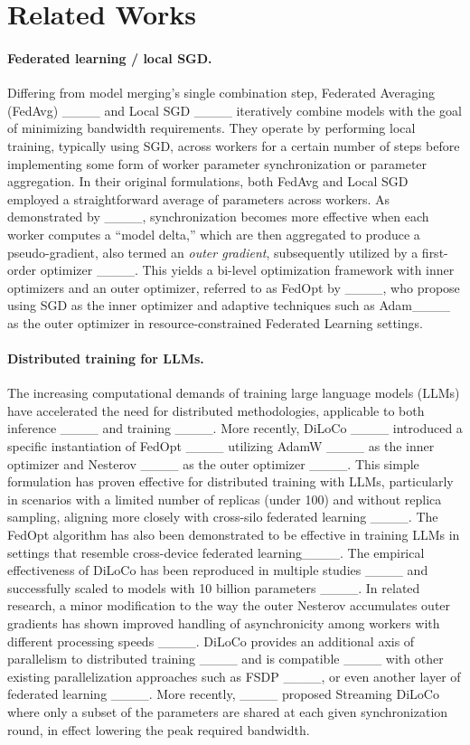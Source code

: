\section{Related Works}
\label{sec:related_works}



\paragraph{Federated learning / local SGD.}  Differing from model merging's single combination step, Federated Averaging (FedAvg) ____ and Local SGD ____ iteratively combine models with the goal of minimizing bandwidth requirements. They operate by performing local training, typically using SGD, across workers for a certain number of steps before implementing some form of worker parameter synchronization or parameter aggregation.  In their original formulations, both FedAvg and Local SGD employed a straightforward average of parameters across workers.  As demonstrated by ____, synchronization becomes more effective when each worker computes a ``model delta,'' which are then aggregated to produce a pseudo-gradient, also termed an \textit{outer gradient}, subsequently utilized by a first-order optimizer ____.  This yields a bi-level optimization framework with inner optimizers and an outer optimizer, referred to as FedOpt by ____, who propose using SGD as the inner optimizer and adaptive techniques such as Adam____ as the outer optimizer in resource-constrained Federated Learning settings.

\paragraph{Distributed training for LLMs.} The increasing computational demands of training large language models (LLMs) have accelerated the need for distributed methodologies, applicable to both inference ____ and training ____. More recently, DiLoCo ____ introduced a specific instantiation of FedOpt ____ utilizing AdamW ____ as the inner optimizer and Nesterov ____ as the outer optimizer ____. This simple formulation has proven effective for distributed training with LLMs, particularly in scenarios with a limited number of replicas (under 100) and without replica sampling, aligning more closely with cross-silo federated learning ____. The FedOpt algorithm has also been demonstrated to be effective in training LLMs in settings that resemble cross-device federated learning____. The empirical effectiveness of DiLoCo has been reproduced in multiple studies ____ and successfully scaled to models with 10 billion parameters ____.  In related research, a minor modification to the way the outer Nesterov accumulates outer gradients has shown improved handling of asynchronicity among workers with different processing speeds ____.  DiLoCo provides an additional axis of parallelism to distributed training ____ and is compatible ____ with other existing parallelization approaches such as FSDP ____, or even another layer of federated learning ____. More recently, ____ proposed Streaming DiLoCo where only a subset of the parameters are shared at each given synchronization round, in effect lowering the peak required bandwidth.

